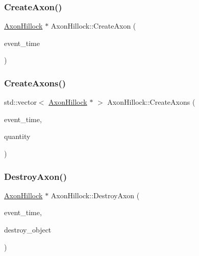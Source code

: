 \subsubsection{\texorpdfstring{Create\+Axon()}{CreateAxon()}}
{\footnotesize\ttfamily \mbox{\hyperlink{classAxonHillock}{Axon\+Hillock}} $\ast$ Axon\+Hillock\+::\+Create\+Axon (\begin{DoxyParamCaption}\item[{std\+::chrono\+::time\+\_\+point$<$ \mbox{\hyperlink{universe_8h_a0ef8d951d1ca5ab3cfaf7ab4c7a6fd80}{Clock}} $>$}]{event\+\_\+time }\end{DoxyParamCaption})}

\mbox{\label{classAxonHillock_a15bf1a433f38b8b0c92e4a4efe22ec6f}} 
\subsubsection{\texorpdfstring{Create\+Axons()}{CreateAxons()}}
{\footnotesize\ttfamily std\+::vector$<$ \mbox{\hyperlink{classAxonHillock}{Axon\+Hillock}} $\ast$ $>$ Axon\+Hillock\+::\+Create\+Axons (\begin{DoxyParamCaption}\item[{std\+::chrono\+::time\+\_\+point$<$ \mbox{\hyperlink{universe_8h_a0ef8d951d1ca5ab3cfaf7ab4c7a6fd80}{Clock}} $>$}]{event\+\_\+time,  }\item[{int}]{quantity }\end{DoxyParamCaption})}

\mbox{\label{classAxonHillock_a031b2cc7292d023506a5124639a941a7}} 
\subsubsection{\texorpdfstring{Destroy\+Axon()}{DestroyAxon()}}
{\footnotesize\ttfamily \mbox{\hyperlink{classAxonHillock}{Axon\+Hillock}} $\ast$ Axon\+Hillock\+::\+Destroy\+Axon (\begin{DoxyParamCaption}\item[{std\+::chrono\+::time\+\_\+point$<$ \mbox{\hyperlink{universe_8h_a0ef8d951d1ca5ab3cfaf7ab4c7a6fd80}{Clock}} $>$}]{event\+\_\+time,  }\item[{\mbox{\hyperlink{classAxonHillock}{Axon\+Hillock}} $\ast$}]{destroy\+\_\+object }\end{DoxyParamCaption})}

